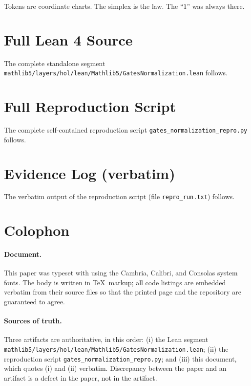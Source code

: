 \documentclass[11pt]{article}
\begin{document}
Tokens are coordinate charts. The simplex is the law. The ``$1$'' was always
there.

\appendix

\section{Full Lean 4 Source}
\label{app:lean}

The complete standalone segment
\texttt{mathlib5/layers/hol/lean/Mathlib5/GatesNormalization.lean} follows.



\section{Full Reproduction Script}
\label{app:repro}

The complete self-contained reproduction script
\texttt{gates\_normalization\_repro.py} follows.



\section{Evidence Log (verbatim)}
\label{app:evidence}

The verbatim output of the reproduction script (file
\texttt{repro\_run.txt}) follows.



\newpage
\section*{Colophon}

\paragraph{Document.} This paper was typeset with  using the Cambria,
Calibri, and Consolas system fonts. The body is written in \TeX\ markup; all
code listings are embedded verbatim from their source files so that the printed
page and the repository are guaranteed to agree.

\paragraph{Sources of truth.} Three artifacts are authoritative, in this order:
(i) the Lean segment \texttt{mathlib5/layers/hol/lean/Mathlib5/GatesNormalization.lean};
(ii) the reproduction script \texttt{gates\_normalization\_repro.py}; and
(iii) this document, which quotes (i) and (ii) verbatim. Discrepancy between the
paper and an artifact is a defect in the paper, not in the artifact.
\end{document}
